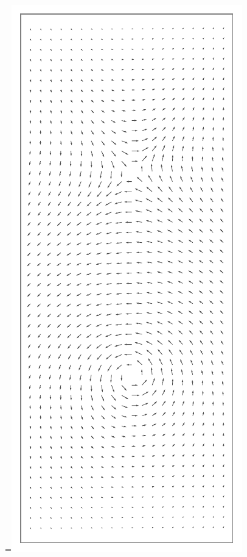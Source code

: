 \documentclass{report}
\begin{document}
\begin{titlepage}
	\begin{minipage}[t]{\dimexpr \textwidth-10cm-\columnsep}
		\maketitle
	 \end{minipage}
	\hfill
	\begingroup
{}=\hbox{\includegraphics{figs/vortex.pdf}}%
\parbox{\wd0}{}\endgroup
\end{titlepage}
\end{document}
